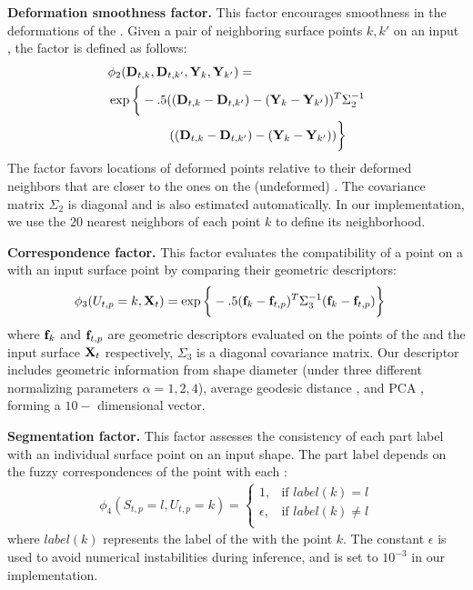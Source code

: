 \textbf{Deformation smoothness factor.} This factor encourages smoothness in the deformations of the . Given a pair of neighboring surface points $k, k'$ on an input , the factor is defined as follows:
\begin{align*}
& \phi_2( \mathbf{D}_{t,k}, \mathbf{D}_{t,k'}, \mathbf{Y}_k, \mathbf{Y}_{k'} ) = \\
& \exp\bigg\{ -.5( (\mathbf{D}_{t,k} - \mathbf{D}_{t,k'})- (\mathbf{Y}_k - \mathbf{Y}_{k'}) )^T \Sigma_2^{-1} \\ 
& \,\,\,\,\,\,\,\,\,\,\,\,\,\,\,\,\,\,\,\,\,\,\,\,\,\,\,\,\,((\mathbf{D}_{t,k} - \mathbf{D}_{t,k'})- (\mathbf{Y}_k - \mathbf{Y}_{k'})) \bigg\}
\end{align*}
The factor favors locations of deformed points relative to their deformed neighbors that are closer to the ones on the (undeformed) . The covariance matrix $\Sigma_2$ is diagonal and is also estimated automatically. In our implementation, we use the $20$ nearest neighbors of each point $k$ to define its neighborhood. 

\textbf{Correspondence factor.} This factor evaluates the compatibility of a point on a  with an input surface point by comparing their geometric descriptors:
\begin{align*}
& \phi_3 ( U_{t,p} = k, \mathbf{X}_t ) = \exp\bigg\{ - .5(\mathbf{f}_k - \mathbf{f}_{t,p})^T \Sigma_3^{-1}(\mathbf{f}_k -\mathbf{f}_{t,p}) \bigg\}
\end{align*}
where $\mathbf{f}_k$ and $\mathbf{f}_{t,p}$ are geometric descriptors evaluated on the points of the  and the input surface $\mathbf{X}_t$ respectively, $\Sigma_3$ is a diagonal covariance matrix. Our descriptor includes geometric information from shape diameter \cite{shapira2008consistent} (under three different normalizing parameters $\alpha=1,2,4$), average geodesic distance \cite{Hilaga01}, and PCA \cite{Kim13}, forming a $10-$ dimensional vector.

\textbf{Segmentation factor.} This factor assesses the consistency of each part label with an individual surface point on an input shape. The part label depends on the fuzzy correspondences of the point with each : 
\begin{align*}
\phi_4 ( S_{t,p} = l, U_{t,p} = k ) =
\begin{cases}
    1,& \text{if } label(k) = l \\
    \epsilon,& \text{if } label(k) \ne l \\
\end{cases} 
\end{align*}
where $label(k)$ represents the label of the  with the point $k$. The constant $\epsilon$ is used to avoid numerical instabilities during inference, and is set to $10^{-3}$ in our implementation. 
 
